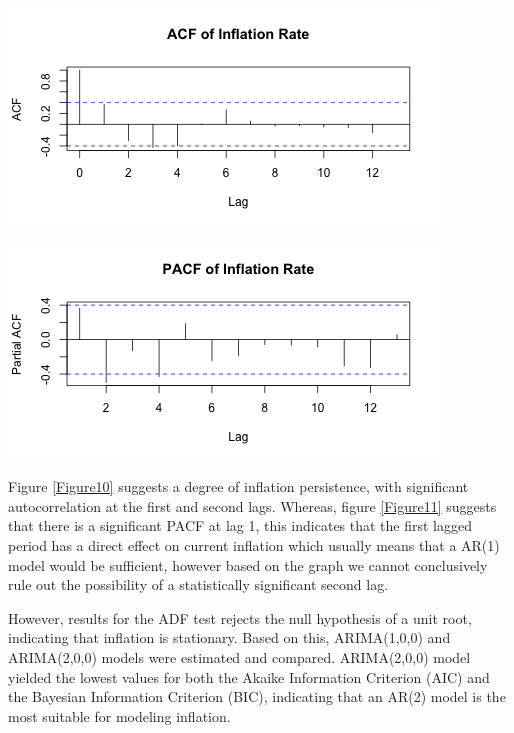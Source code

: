 \documentclass[11pt,preprint]{elsarticle}
\let\origfigure\figure
\let\endorigfigure\endfigure
\renewenvironment{figure}[1][2] {
    \expandafter\origfigure\expandafter[H]
} {
    \endorigfigure
}
\numberwithin{equation}{section}
\numberwithin{figure}{section}
\numberwithin{table}{section}
\begin{document}
\begin{figure}[H]

{\centering \includegraphics{DatSci-Project-_files/figure-latex/Figure10-1} 

}

\caption{Autocorrelation Function of Inflation \label{Figure10}}\label{fig:Figure10}
\end{figure}

\begin{figure}[H]

{\centering \includegraphics{DatSci-Project-_files/figure-latex/Figure11-1} 

}

\caption{Partial Autocorrelation Function of Inflation\label{Figure11}}\label{fig:Figure11}
\end{figure}

Figure \ref{Figure10} suggests a degree of inflation persistence, with
significant autocorrelation at the first and second lags. Whereas,
figure \ref{Figure11} suggests that there is a significant PACF at lag
1, this indicates that the first lagged period has a direct effect on
current inflation which usually means that a AR(1) model would be
sufficient, however based on the graph we cannot conclusively rule out
the possibility of a statistically significant second lag.

However, results for the ADF test rejects the null hypothesis of a unit
root, indicating that inflation is stationary. Based on this,
ARIMA(1,0,0) and ARIMA(2,0,0) models were estimated and compared.
ARIMA(2,0,0) model yielded the lowest values for both the Akaike
Information Criterion (AIC) and the Bayesian Information Criterion
(BIC), indicating that an AR(2) model is the most suitable for modeling
inflation.
\end{document}
